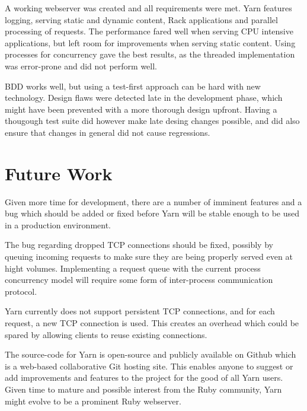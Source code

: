 A working webserver was created and all requirements were met. Yarn features
logging, serving static and dynamic content, Rack applications and parallel
processing of requests.
The performance fared well when serving CPU intensive applications, but left
room for improvements when serving static content.
Using processes for concurrency gave the best results, as the threaded
implementation was error-prone and did not perform well.

BDD works well, but using a test-first approach can be hard with new
technology. Design flaws were detected late in the development phase, which
might have been prevented with a more thorough design upfront. Having a
thougough test suite did however make late desing changes possible, and did
also ensure that changes in general did not cause regressions.

\section{Future Work}
Given more time for development, there are a number of imminent features and
a bug which should be added or fixed before Yarn will be stable enough to be
used in a production environment.

The bug regarding dropped TCP connections should be fixed, possibly by
queuing incoming requests to make sure they are being properly served
even at hight volumes. Implementing a request queue with the current process
concurrency model will require some form of inter-process communication
protocol.

Yarn currently does not support persistent TCP connections, and for each
request, a new TCP connection is used. This creates an overhead which could be
spared by allowing clients to reuse existing connections.

The source-code for Yarn is open-source and publicly available on Github which
is a web-based collaborative Git hosting site. This enables anyone to suggest
or add improvements and features to the project for the good of all Yarn
users. Given time to mature and possible interest from the Ruby community,
Yarn might evolve to be a prominent Ruby webserver.

